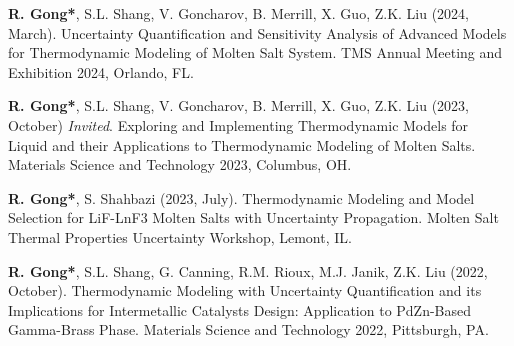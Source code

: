 
\begin{etaremune}

\item \textbf{R. Gong*}, S.L. Shang, V. Goncharov, B. Merrill, X. Guo, Z.K. Liu
(2024, March).
Uncertainty Quantification and Sensitivity Analysis of Advanced Models for Thermodynamic Modeling of Molten Salt System. 
TMS Annual Meeting and Exhibition 2024,
Orlando, FL.
\item \textbf{R. Gong*}, S.L. Shang, V. Goncharov, B. Merrill, X. Guo, Z.K. Liu
(2023, October) \emph{Invited}.
Exploring and Implementing Thermodynamic Models for Liquid and their Applications to Thermodynamic Modeling of Molten Salts. 
Materials Science and Technology 2023,
Columbus, OH.
\item \textbf{R. Gong*}, S. Shahbazi
(2023, July).
Thermodynamic Modeling and Model Selection for LiF-LnF3 Molten Salts with Uncertainty Propagation.
Molten Salt Thermal Properties Uncertainty Workshop,
Lemont, IL.
\item \textbf{R. Gong*}, S.L. Shang, G. Canning, R.M. Rioux, M.J. Janik, Z.K. Liu
(2022, October).
Thermodynamic Modeling with Uncertainty Quantification and its Implications for Intermetallic Catalysts Design: Application to PdZn-Based Gamma-Brass Phase.
Materials Science and Technology 2022,
Pittsburgh, PA.

\end{etaremune}
\vspace{-0.6em}
\vspace{0.4em}
